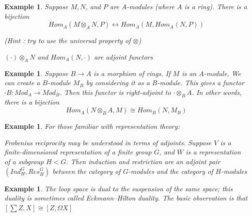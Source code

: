 \documentclass{article}
\newtheorem{example}[theorem]{Example}
\begin{document}
\begin{example}
    Suppose $M, N$, and $P$ are $A$-modules (where $A$ is a ring). There is a bijection $$
    Hom_A(M\otimes_A N, P)\leftrightarrow Hom_A(M, Hom_A(N, P))
    $$
    
    (Hint : try to use the universal property of $\otimes$)

    $(\cdot) \otimes_A N$ and $Hom_A(N, \cdot)$ are adjoint functors
\end{example}
\begin{example}
    Suppose $B \rightarrow A$ is a morphism of rings. If $M$ is an $A$-module, We can create a $B$-module $M_B$ by considering it as a $B$-module. This gives a functor $\cdot B : Mod_A \rightarrow Mod_B$. Then this functor is right-adjoint to $\cdot \otimes_B A$. In other words, there is a bijection
    $$
     Hom_A(N \otimes_B A,M) \cong Hom_B(N,M_B)
    $$
\end{example}
\begin{example}
    For those familiar with representation theory:
    
Frobenius reciprocity may be understood in terms of adjoints. Suppose $V$ is a
finite-dimensional representation of a finite group $G$, and $W$ is a representation of
a subgroup $H < G$. Then induction and restriction are an adjoint pair $(Ind^G_H, Res^G_H)$ between the category of $G$-modules and the category of $H$-modules
\end{example}
\begin{example}
    The loop space is dual to the suspension of the same space; this duality is sometimes called Eckmann–Hilton duality. The basic observation is that
    $
     [\sum Z,X]\cong[Z,\Omega X]
    $
\end{example}
\end{document}
